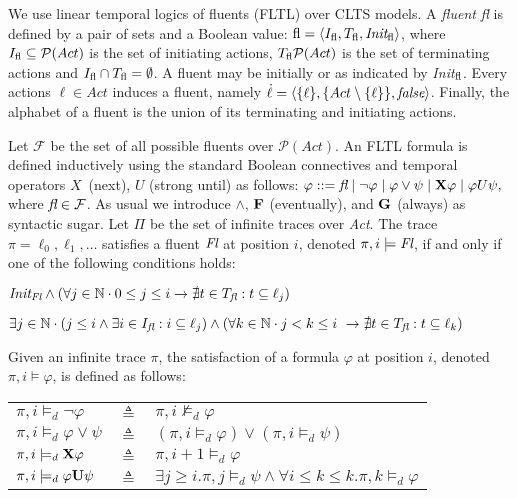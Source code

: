 
We use linear temporal logics of fluents (FLTL) over CLTS models. %
A \emph{fluent} \emph{fl} is defined by a pair of sets and a Boolean value: $\emph{\emph{fl}} = \langle I_{\emph{\emph{fl}}}, T_{\emph{\emph{fl}}}, \emph{Init}_{\emph{\emph{fl}}} \rangle$, where $I_{\emph{\emph{fl}}}\subseteq \mathcal{P}(Act)$ is the set of initiating actions, $T_{\emph{\emph{fl}}} \mathcal{P}(Act)$ is the set of terminating actions and $I_{\emph{\emph{fl}}}\cap T_{\emph{\emph{fl}}}=\emptyset$. 
A fluent may be initially \true or \false as indicated by \emph{Init}$_{\emph{\emph{fl}}}$. 
Every actions $\ell\in Act$ induces a fluent, namely $\dot{\ell}=\langle \{\ell\}, \{Act\setminus \{\ell\}\}, \emph{false}\rangle$. 
Finally, the alphabet of a fluent is the union of its terminating and initiating actions.

Let $\mathcal{F}$ be the set of all possible fluents over $\mathcal{P}(Act)$. 
An FLTL formula is defined inductively using the standard Boolean connectives and temporal operators $X$~(next), $U$ (strong until) as follows: 
$\varphi ::= \emph{fl} \mid \neg \varphi \mid \varphi \vee \psi \mid {\bf X} \varphi \mid \varphi U \psi,$
where $\emph{fl}\in\mathcal{F}$. 
As usual we introduce $\wedge$, ${\bf F}$ (eventually), and ${\bf G}$ (always) as syntactic sugar. 
Let $\Pi$ be the set of infinite traces over \emph{Act}.
The trace $\pi=\ell_0,\ell_1,\ldots$ satisfies a fluent $\emph{Fl}$ at position $i$, denoted $\pi,i \models \emph{Fl}$, if and only if one of the following conditions holds:
\begin{list}{-}%
	\item $\emph{Init}_{\emph{Fl}} \wedge (\forall j \in \mathbb{N} \cdot 0 \leq j \leq i \rightarrow \nexists t \in T_{\emph{fl}}: t \subseteq \ell_j)$
	\item $\exists j \in \mathbb{N} \cdot (j \leq i \wedge \exists i \in I_{\emph{fl}}: i \subseteq \ell_j) \wedge (\forall k \in \mathbb{N} \cdot j < k \leq i \ \rightarrow \nexists t \in T_{\emph{fl}}: t \subseteq \ell_k)$
\end{list}

Given an infinite trace $\pi$, the satisfaction of a formula $\varphi$ at position $i$, denoted $\pi,i\models\varphi$, is defined as follows:

\begin{tabular}{ l c l }
$\pi, i \models_d \neg \varphi$ & $\triangleq$ & $\pi, i \not\models_d \varphi$\\
$\pi, i \models_d \varphi \vee \psi$ & $\triangleq$ & $(\pi, i \models_d \varphi) \vee (\pi, i \models_d \psi)$\\
$\pi, i \models_d {\bf X} \varphi$ & $\triangleq$ & $\pi, i +1 \models_d \varphi$\\
$\pi, i \models_d \varphi {\bf U} \psi$ & $\triangleq$ & $\exists j \geq i . \pi,j \models_d \psi \wedge \forall i \leq k \le k. \pi, k \models_d \varphi$\\
\end{tabular}
  
